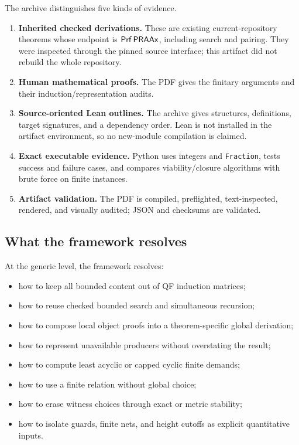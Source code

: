 The archive distinguishes five kinds of evidence.
\begin{enumerate}[label=(\arabic*)]
  \item \textbf{Inherited checked derivations.}  These are existing current-repository theorems whose endpoint is \(\mathsf{Prf}\,\mathsf{PRAAx}\), including search and pairing.  They were inspected through the pinned source interface; this artifact did not rebuild the whole repository.
  \item \textbf{Human mathematical proofs.}  The PDF gives the finitary arguments and their induction/representation audits.
  \item \textbf{Source-oriented Lean outlines.}  The archive gives structures, definitions, target signatures, and a dependency order.  Lean is not installed in the artifact environment, so no new-module compilation is claimed.
  \item \textbf{Exact executable evidence.}  Python uses integers and \texttt{Fraction}, tests success and failure cases, and compares viability/closure algorithms with brute force on finite instances.
  \item \textbf{Artifact validation.}  The PDF is compiled, preflighted, text-inspected, rendered, and visually audited; JSON and checksums are validated.
\end{enumerate}

\subsection{What the framework resolves}

At the generic level, the framework resolves:
\begin{itemize}
  \item how to keep all bounded content out of QF induction matrices;
  \item how to reuse checked bounded search and simultaneous recursion;
  \item how to compose local object proofs into a theorem-specific global derivation;
  \item how to represent unavailable producers without overstating the result;
  \item how to compute least acyclic or capped cyclic finite demands;
  \item how to use a finite relation without global choice;
  \item how to erase witness choices through exact or metric stability;
  \item how to isolate guards, finite nets, and height cutoffs as explicit quantitative inputs.
\end{itemize}

